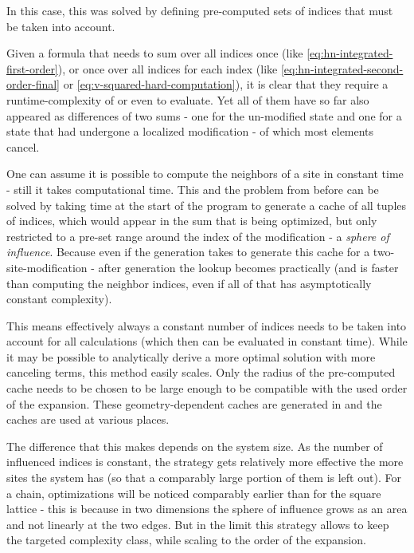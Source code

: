In this case, this was solved by defining pre-computed sets of indices that must be taken into account.

Given a formula that needs to sum over all indices once (like \autoref{eq:hn-integrated-first-order}), or once over all indices for each index (like \autoref{eq:hn-integrated-second-order-final} or \autoref{eq:v-squared-hard-computation}), it is clear that they require a runtime-complexity of  or even  to evaluate.
Yet all of them have so far also appeared as differences of two sums - one for the un-modified state and one for a state that had undergone a localized modification - of which most elements cancel.

One can assume it is possible to compute the neighbors of a site in constant time - still it takes computational time.
This and the problem from before can be solved by taking time at the start of the program to generate a cache of all tuples of indices, which would appear in the sum that is being optimized, but only restricted to a pre-set range around the index of the modification - a \emph{sphere of influence}.
Because even if the generation takes  to generate this cache for a two-site-modification - after generation the lookup becomes practically  (and is faster than computing the neighbor indices, even if all of that has asymptotically constant complexity).

This means effectively always a constant number of indices needs to be taken into account for all calculations (which then can be evaluated in constant time).
While it may be possible to analytically derive a more optimal solution with more canceling terms, this method easily scales.
Only the radius of the pre-computed cache needs to be chosen to be large enough to be compatible with the used order of the expansion.
These geometry-dependent caches are generated in  and the caches are used at various places.

The difference that this makes depends on the system size. 
As the number of influenced indices is constant, the strategy gets relatively more effective the more sites the system has (so that a comparably large portion of them is left out).
For a chain, optimizations will be noticed comparably earlier than for the square lattice - this is because in two dimensions the sphere of influence grows as an area and not linearly at the two edges.
But in the limit this strategy allows to keep the targeted complexity class, while scaling to the order of the expansion.